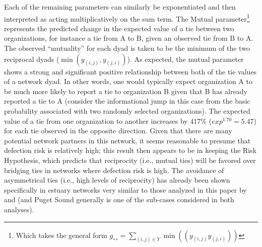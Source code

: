 \documentclass[12pt,a4paper,titlepage]{article}
\begin{document}
Each of the remaining parameters can similarly be exponentiated and then interpreted as acting multiplicatively on the sum term. The Mutual parameter\footnote{Which takes the general form $g_{\leftrightarrow} = \sum_{(i,j) \in Y} \min({( y_{(i,j)} y_{(j,i)})})$} represents the predicted change in the expected value of a tie between two organizations, for instance a tie from A to B, given an observed tie from B to A. The observed “mutuality” for each dyad is taken to be the minimum of the two reciprocal dyads ($\min({y_{(i,j)},y_{(j,i)}})$). As expected, the mutual parameter shows a strong and significant positive relationship between both of the tie values of a network dyad. In other words, one would typically expect organization A to be much more likely to report a tie to organization B given that B has already reported a tie to A (consider the informational jump in this case from the basic probability associated with two randomly selected organizations). The expected value of a tie from one organization to another increases by $417\%$ ($exp^{1.70} = 5.47$) for each tie observed in the opposite direction. Given that there are many potential network partners in this network, it seems reasonable to presume that defection risk is relatively high; this result then appears to be in keeping the \textcite{berardo2010} Risk Hypothesis, which predicts that reciprocity (i.e., mutual ties) will be favored over bridging ties in networks where defection risk is high. The avoidance of asymmetrical ties (i.e., high levels of reciprocity) has already been shown specifically in estuary networks very similar to those analyzed in this paper by \textcite{berardo2010} and \textcite{desmarais2012} (and Puget Sound generally is one of the sub-cases considered in both analyses).  
\end{document}
